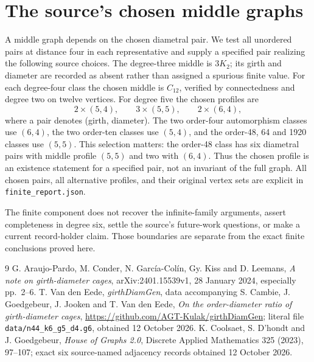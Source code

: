 \documentclass[11pt,a4paper]{article}
\begin{document}
\section{The source's chosen middle graphs}
A middle graph depends on the chosen diametral pair. We test all unordered
pairs at distance four in each representative and supply a specified pair
realizing the following source choices. The degree-three middle is $3K_2$;
its girth and diameter are recorded as absent rather than assigned a spurious
finite value. For each degree-four class the chosen middle is $C_{12}$,
verified by connectedness and degree two on twelve vertices.
For degree five the chosen profiles are
\[
 2\times(5,4),\qquad3\times(5,5),\qquad2\times(6,4),
\]
where a pair denotes (girth, diameter). The two order-four automorphism classes
use $(6,4)$, the two order-ten classes use $(5,4)$, and the order-48, 64 and
1920 classes use $(5,5)$.
This selection matters: the order-48 class has six diametral pairs with
middle profile $(5,5)$ and two with $(6,4)$. Thus the chosen profile is an
existence statement for a specified pair, not an invariant of the full graph.
All chosen pairs, all alternative profiles, and their original vertex sets
are explicit in \texttt{finite\_report.json}.

The finite component does not recover the infinite-family arguments, assert
completeness in degree six, settle the source's future-work questions, or
make a current record-holder claim. Those boundaries are separate from the
exact finite conclusions proved here.

\begin{thebibliography}{9}
 G. Araujo-Pardo, M. Conder, N. Garc\'ia-Col\'in, Gy. Kiss
and D. Leemans, \emph{A note on girth-diameter cages}, arXiv:2401.15539v1,
28 January 2024, especially pp.~2--6.
 T. Van den Eede, \emph{girthDiamGen}, data accompanying
S. Cambie, J. Goedgebeur, J. Jooken and T. Van den Eede,
\emph{On the order-diameter ratio of girth-diameter cages},
\url{https://github.com/AGT-Kulak/girthDiamGen}; literal file
\texttt{data/n44\_k6\_g5\_d4.g6}, obtained 12 October 2026.
 K. Coolsaet, S. D'hondt and J. Goedgebeur,
\emph{House of Graphs 2.0}, Discrete Applied Mathematics 325 (2023),
97--107; exact six source-named adjacency records obtained 12 October 2026.
\end{thebibliography}
\end{document}
